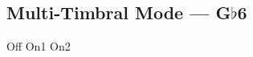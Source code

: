 \subsection[Multi-Timbral Mode]{Multi-Timbral Mode --- \UiKey{\SET}G$\flat$6}









































Off
On1
On2
